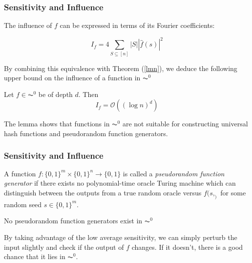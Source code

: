 \documentclass{beamer}
\begin{document}
\begin{frame}
  \frametitle{Sensitivity and Influence}
  The influence of $f$ can be expressed in terms of its Fourier coefficients:

  \begin{equation}
    I_f = 4\sum_{S \subseteq [n]} |S||\hat{f}(s)|^2
  \end{equation}

  By combining this equivalence with Theorem (\ref{lmn}), we deduce the following upper bound on the influence of a function in $\AC^0$

  \begin{lemma} \label{influence}
    Let $f \in \AC^0$ be of depth $d$. Then
    \begin{equation}
      I_f = \mathcal{O}((\log n)^d)
    \end{equation}
  \end{lemma}
  The lemma shows that functions in $\AC^0$  are not suitable for constructing universal hash functions and pseudorandom function generators.
\end{frame}

\begin{frame}
  \frametitle{Sensitivity and Influence}
  \begin{definition}
    A function $f:\{0,1\}^m \times \{0,1\}^n \rightarrow \{0,1\}$ is called a \emph{pseudorandom function generator} if there exists no polynomial-time oracle Turing machine which can distinguish between the outputs from a true random oracle versus $f(s,_)$ for some random seed $s \in \{0,1\}^m$.
  \end{definition}

  \begin{lemma}
    No pseudorandom function generators exist in $\AC^0$
  \end{lemma}
  By taking advantage of the low average sensitivity, we can simply perturb the input slightly and check if the output of $f$ changes. If it doesn't, there is a good chance that
  it lies in $\AC^0$.
\end{frame}
\end{document}
